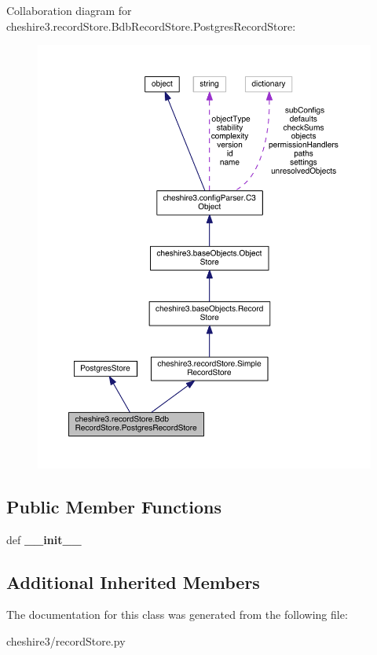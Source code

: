 Collaboration diagram for cheshire3.\-record\-Store.\-Bdb\-Record\-Store.\-Postgres\-Record\-Store\-:
\nopagebreak
\begin{figure}[H]
\begin{center}
\leavevmode
\includegraphics[width=350pt]{classcheshire3_1_1record_store_1_1_bdb_record_store_1_1_postgres_record_store__coll__graph}
\end{center}
\end{figure}
\subsection*{Public Member Functions}
\begin{DoxyCompactItemize}
\item 
\hypertarget{classcheshire3_1_1record_store_1_1_bdb_record_store_1_1_postgres_record_store_a16a5e689f99c737838a8ddb2fb9760a1}{def {\bfseries \-\_\-\-\_\-init\-\_\-\-\_\-}}\label{classcheshire3_1_1record_store_1_1_bdb_record_store_1_1_postgres_record_store_a16a5e689f99c737838a8ddb2fb9760a1}

\end{DoxyCompactItemize}
\subsection*{Additional Inherited Members}


The documentation for this class was generated from the following file\-:\begin{DoxyCompactItemize}
\item 
cheshire3/record\-Store.\-py\end{DoxyCompactItemize}
